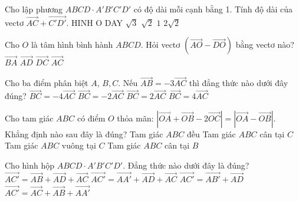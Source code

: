 \begin{ex}
 Cho lập phương $ABCD \cdot A'B'C'D'$ có độ dài mỗi cạnh bằng 1. Tính độ dài của vectơ $\vec{AC}+\vec{C'D'}$.
{\centering\color{red} HINH O DAY}
\choice
{$\sqrt{3}$}
{$\sqrt{2}$}
{\True $1$}
{$2\sqrt{2}$}
\end{ex}
\begin{ex}
Cho $O$ là tâm hình bình hành $ABCD$. Hỏi vectơ $\left(\vec{AO}-\vec{DO}\right)$ bằng vectơ nào?
\choice
{$\vec{BA}$}
{\True $\vec{AD}$}
{$\vec{DC}$}
{$\vec{AC}$}
\end{ex}
\begin{ex}
Cho ba điểm phân biệt $A$, $B,C$. Nếu $\vec{AB}=-3\vec{AC}$ thì đẳng thức nào dưới đây đúng?
\choice
{$\vec{BC}=-4\vec{AC}$}
{$\vec{BC}=-2\vec{AC}$}
{$\vec{BC}=2\vec{AC}$}
{\True $\vec{BC}=4\vec{AC}$}
\end{ex}
\begin{ex}
Cho tam giác $ABC$ có điểm $O$ thỏa mãn: $\left| \vec{OA}+\vec{OB}-2\vec{OC} \right|=\left| \vec{OA}-\vec{OB} \right|$. Khẳng định nào sau đây là đúng?
\choice
{Tam giác $ABC$ đều }
{Tam giác $ABC$ cân tại $C$}
{\True Tam giác $ABC$ vuông tại $C$ }
{Tam giác $ABC$ cân tại $B$}
\end{ex}
\begin{ex}
 Cho hình hộp $ABCD \cdot A'B'C'D'$. Đẳng thức nào dưới đây là đúng?
\choice
{$\vec{AC'}=\vec{AB}+\vec{AD}+\vec{AC}$}
{$\vec{AC'}=\vec{AA'}+\vec{AD}+\vec{AC}$}
{\True $\vec{AC'}=\vec{AB'}+\vec{AD}$}
{$\vec{AC'}=\vec{AC}+\vec{AB}+\vec{AA'}$}
\end{ex}
